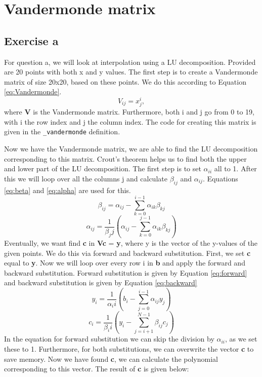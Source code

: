 \section{Vandermonde matrix}


\subsection{Exercise a}

For question a, we will look at interpolation using a LU decomposition. Provided are 20 points with both x and y values. The first step is to create a Vandermonde matrix of size 20x20, based on these points. We do this according to Equation \ref{eq:Vandermonde}.
\begin{equation}\label{eq:Vandermonde}
    V_{ij} = x^i_j,
\end{equation}
where \textbf{V} is the Vandermonde matrix. Furthermore, both i and j go from 0 to 19, with i the row index and j the column index. The code for creating this matrix is given in the \texttt{\_vandermonde} definition.  

Now we have the Vandermonde matrix, we are able to find the LU decomposition corresponding to this matrix. Crout's theorem helps us to find both the upper and lower part of the LU decomposition. The first step is to set $\alpha_{ii}$ all to 1. After this we will loop over all the columns j and calculate $\beta_{ij}$ and $\alpha_{ij}$. Equations \ref{eq:beta} and \ref{eq:alpha} are used for this.
\begin{equation}\label{eq:beta}
    \beta_{ij} = \alpha_{ij} - \sum^{i-1}_{k=0}{\alpha_{ik}\beta_{kj}}
\end{equation}
\begin{equation}\label{eq:alpha}
    \alpha_{ij} = \frac{1}{\beta_jj} \left(\alpha_{ij} - \sum^{j-1}_{k=0}{\alpha_{ik}\beta_{kj}}\right)
\end{equation}
Eventually, we want find \textbf{c} in \textbf{Vc} = \textbf{y}, where y is the vector of the y-values of the given points. We do this via forward and backward substitution. First, we set \textbf{c} equal to \textbf{y}. Now we will loop over every row i in \textbf{b} and apply the forward and backward substitution. Forward substitution is given by Equation \ref{eq:forward} and backward substitution is given by Equation \ref{eq:backward}
\begin{equation}\label{eq:forward}
    y_i = \frac{1}{\alpha_ii} \left(b_i - \sum^{i-1}_{j=0}{\alpha_{ij}y_{j}}\right)
\end{equation}
\begin{equation}\label{eq:backward}
    c_i = \frac{1}{\beta_ii} \left(y_i - \sum^{N-1}_{j=i+1}{\beta_{ij}c_{j}}\right)
\end{equation}
In the equation for forward substitution we can skip the division by $\alpha_{ii}$, as we set these to 1. Furthermore, for both substitutions, we can overwrite the vector \textbf{c} to save memory. Now we have found \textbf{c}, we can calculate the polynomial corresponding to this vector. The result of \textbf{c} is given below: 

